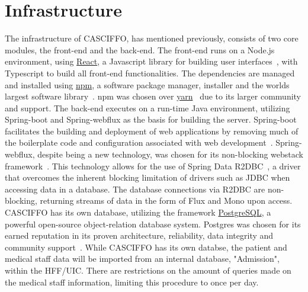 \section{Infrastructure}
\label{sec:infrastructure}
The infrastructure of CASCIFFO, has mentioned previously, consists of two core modules, the front-end and the back-end.  
The front-end runs on a Node.js environment, using \href{https://reactjs.org/}{React}, a Javascript library for building user interfaces~\cite{reactjs},  with Typescript to build all front-end functionalities. The dependencies are managed and installed using \href{https://docs.npmjs.com/about-npm}{npm}, a software package manager, installer and the worlds largest software library~\cite{npm}. npm was chosen over \href{https://yarnpkg.com/}{yarn}~\cite{yarn} due to its larger community and support.
The back-end executes on a run-time Java environment, utilizing Spring-boot and Spring-webflux as the basis for building the server. Spring-boot facilitates the building and deployment of web applications by removing much of the boilerplate code and configuration associated with web development~\cite{spring-boot}. Spring-webflux, despite being a new technology, was chosen for its non-blocking webstack framework~\cite{spring-webflux}. This technology allows for the use of Spring Data R2DBC~\cite{r2dbc}, a driver that overcomes the inherent blocking limitation of drivers such as JDBC when accessing data in a database. The database connections via R2DBC are non-blocking, returning streams of data in the form of Flux and Mono upon access.
CASCIFFO has its own database, utilizing the framework \href{https://www.postgresql.org/about/}{PostgreSQL}, a powerful open-source object-relation database system. Postgres was chosen for its earned reputation in its proven architecture, reliability, data integrity and community support~\cite{postgresql}. While CASCIFFO has its own databse, the patient and medical staff data will be imported from an internal database, "Admission", within the HFF/UIC. There are restrictions on the amount of queries made on the medical staff information, limiting this procedure to once per day.

